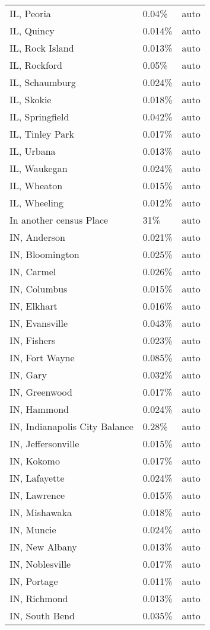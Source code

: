 \begin{longtable}[]{@{}lll@{}}
IL, Peoria & 0.04\% & auto \\
IL, Quincy & 0.014\% & auto \\
IL, Rock Island & 0.013\% & auto \\
IL, Rockford & 0.05\% & auto \\
IL, Schaumburg & 0.024\% & auto \\
IL, Skokie & 0.018\% & auto \\
IL, Springfield & 0.042\% & auto \\
IL, Tinley Park & 0.017\% & auto \\
IL, Urbana & 0.013\% & auto \\
IL, Waukegan & 0.024\% & auto \\
IL, Wheaton & 0.015\% & auto \\
IL, Wheeling & 0.012\% & auto \\
In another census Place & 31\% & auto \\
IN, Anderson & 0.021\% & auto \\
IN, Bloomington & 0.025\% & auto \\
IN, Carmel & 0.026\% & auto \\
IN, Columbus & 0.015\% & auto \\
IN, Elkhart & 0.016\% & auto \\
IN, Evansville & 0.043\% & auto \\
IN, Fishers & 0.023\% & auto \\
IN, Fort Wayne & 0.085\% & auto \\
IN, Gary & 0.032\% & auto \\
IN, Greenwood & 0.017\% & auto \\
IN, Hammond & 0.024\% & auto \\
IN, Indianapolis City Balance & 0.28\% & auto \\
IN, Jeffersonville & 0.015\% & auto \\
IN, Kokomo & 0.017\% & auto \\
IN, Lafayette & 0.024\% & auto \\
IN, Lawrence & 0.015\% & auto \\
IN, Mishawaka & 0.018\% & auto \\
IN, Muncie & 0.024\% & auto \\
IN, New Albany & 0.013\% & auto \\
IN, Noblesville & 0.017\% & auto \\
IN, Portage & 0.011\% & auto \\
IN, Richmond & 0.013\% & auto \\
IN, South Bend & 0.035\% & auto \\

\end{longtable}
